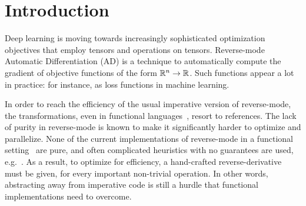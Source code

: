 \section{Introduction}
\label{sec:intro}



Deep learning is moving towards increasingly sophisticated optimization objectives that employ tensors and operations on tensors.
Reverse-mode Automatic Differentiation (AD) is a technique to automatically compute the gradient of objective functions of the form $\mathbb{R}^n\to\mathbb{R}$.
Such functions appear a lot in practice: for instance, as loss functions in machine learning.

In order to reach the efficiency of the usual imperative version of reverse-mode, the transformations, even in functional languages~\cite{pearlmutter2008reverse}, resort to references.
The lack of purity in reverse-mode is known to make it significantly harder to optimize and parallelize. 
None of the current implementations of reverse-mode in a functional setting~\cite{lantern_icfp,pearlmutter2008reverse,baydin2016diffsharp} are pure, and often complicated heuristics with no guarantees are used, e.g.~\cite{xla}.
As a result, to optimize for efficiency, a hand-crafted reverse-derivative must be given, for every important non-trivial operation.
In other words, abstracting away from imperative code is still a hurdle that functional implementations need to overcome.

